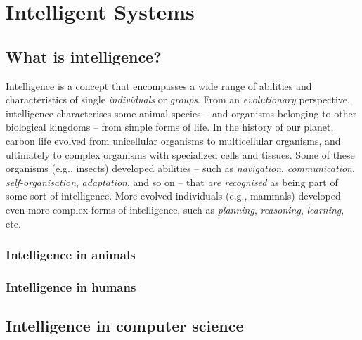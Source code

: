 
\chapter{Intelligent Systems}
\label{ch:intelligent-systems}

\section{What is intelligence?}\label{sec:what-is-intelligence}

Intelligence is a concept that encompasses a wide range of abilities and characteristics of single \emph{individuals} or \emph{groups}.
%
From an \emph{evolutionary} perspective, intelligence characterises some animal species -- and organisms belonging to other biological kingdoms -- from simple forms of life.
%
In the history of our planet, carbon life evolved from unicellular organisms to multicellular organisms, and ultimately to complex organisms with specialized cells and tissues.
%
Some of these organisms (e.g., insects) developed abilities -- such as \emph{navigation}, \emph{communication}, \emph{self-organisation}, \emph{adaptation}, and so on -- that \emph{are recognised} as being part of some sort of intelligence.
%
More evolved individuals (e.g., mammals) developed even more complex forms of intelligence, such as \emph{planning}, \emph{reasoning}, \emph{learning}, etc.




\subsection{Intelligence in animals}\label{subsec:intelligence-in-animals}

\subsection{Intelligence in humans}\label{subsec:intelligence-in-humans}

\section{Intelligence in computer science}\label{sec:intelligence-in-computer-science}

